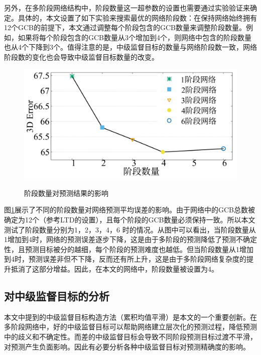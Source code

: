 另外，在多阶段网络结构中，阶段数量这一超参数的设置也需要通过实验验证来确定。具体的，本文设置了如下实验来搜索最优的网络阶段数：在保持网络始终拥有12个GCB的前提下，本文通过调整每个阶段包含的GCB数量来调整阶段数量。例如，如果将每个阶段包含的GCB数量从3个增加到4个，则网络中包含的阶段数量也从4个下降到3个。值得注意的是，中级监督目标的数量与网络阶段数一致，网络阶段数的变化也会导致中级监督目标数量的改变。
\begin{figure}[ht]
    \centering
    \includegraphics[width=0.6\columnwidth]{FigMa/smooth_stage_chinese.pdf} \\
    \caption{阶段数量对预测结果的影响}
    \label{fig:ablation-stage-number}
\end{figure}

图\ref{fig:ablation-stage-number}展示了不同的阶段数量对网络预测平均误差的影响。由于网络中的GCB总数被确定为12个（参考LTD的设置），且每个阶段的GCB数量必须保持一致。所以本文测试了阶段数量分别为1，2，3，4，6 时的情况。从图中可以看出，当阶段数量从1增加到4时，网络的预测误差逐步下降，这是由于多阶段的预测降低了预测不确定性，且预测目标被分的越细，每个阶段的预测难度也越低。但当阶段数量从1增加到4时，预测误差非但不下降，反而还有所上升，这是由于多阶段网络复杂度的提升抵消了这部分增益。因此，在本文的网络中，阶段数量被设置为4。

\subsection{对中级监督目标的分析}
本文中提到的中级监督目标构造方法（累积均值平滑）是本文的一个重要创新。在多阶段网络中，好的中级监督目标可以帮助网络建立层次化的预测过程，降低预测中的歧义和不确定性。而差的中级监督目标会导致不同阶段预测目标过渡不平滑，对预测产生负面影响。因此有必要分析各种中级监督目标对预测精确度的影响。

